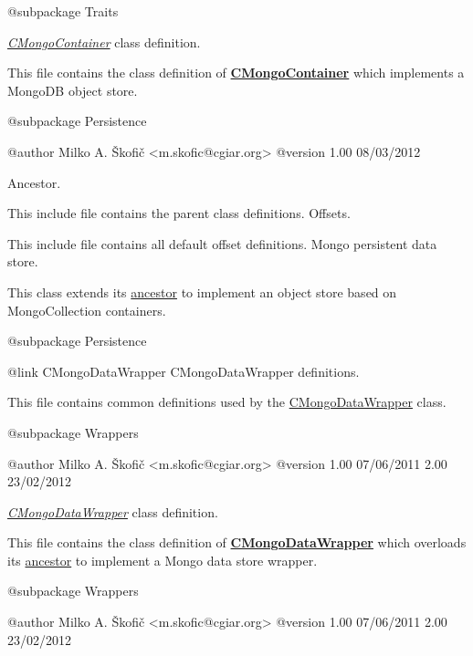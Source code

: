 \begin{DoxyVerb}    @subpackage     Traits\end{DoxyVerb}


{\itshape \hyperlink{class_c_mongo_container}{C\-Mongo\-Container}} class definition.

This file contains the class definition of {\bfseries \hyperlink{class_c_mongo_container}{C\-Mongo\-Container}} which implements a Mongo\-D\-B object store.

\begin{DoxyVerb}    @subpackage     Persistence

    @author         Milko A. Škofič <m.skofic@cgiar.org>
    @version        1.00 08/03/2012\end{DoxyVerb}


Ancestor.

This include file contains the parent class definitions. Offsets.

This include file contains all default offset definitions. Mongo persistent data store.

This class extends its \hyperlink{class_c_container}{ancestor} to implement an object store based on Mongo\-Collection containers.

\begin{DoxyVerb}    @subpackage     Persistence\end{DoxyVerb}


\begin{DoxyVerb}   {@link CMongoDataWrapper CMongoDataWrapper} definitions.
\end{DoxyVerb}


This file contains common definitions used by the \hyperlink{class_c_mongo_data_wrapper}{C\-Mongo\-Data\-Wrapper} class.

\begin{DoxyVerb}    @subpackage     Wrappers

    @author         Milko A. Škofič <m.skofic@cgiar.org>
    @version        1.00 07/06/2011
                            2.00 23/02/2012\end{DoxyVerb}


{\itshape \hyperlink{class_c_mongo_data_wrapper}{C\-Mongo\-Data\-Wrapper}} class definition.

This file contains the class definition of {\bfseries \hyperlink{class_c_mongo_data_wrapper}{C\-Mongo\-Data\-Wrapper}} which overloads its \hyperlink{class_c_data_wrapper}{ancestor} to implement a Mongo data store wrapper.

\begin{DoxyVerb}    @subpackage     Wrappers

    @author         Milko A. Škofič <m.skofic@cgiar.org>
    @version        1.00 07/06/2011
                            2.00 23/02/2012\end{DoxyVerb}



